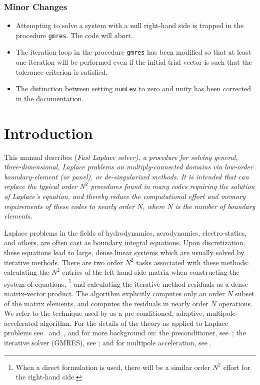 \subsubsection{Minor Changes}
\begin{itemize}
\item{Attempting to solve a system with a null right-hand side is trapped in 
the procedure {\tt gmres}.  The code will abort.}

\item{The iteration loop in the procedure {\tt gmres} has been modified so
that at least one iteration will be performed even if the initial trial 
vector is such that the tolerance criterion is satisfied.}

\item{The distinction between setting {\tt numLev} to zero and unity has been
corrected in the documentation.}
\end{itemize}

\newpage
\section{Introduction}
\label{s:intro}
This manual describes \fas (\it Fast Lap\rm lace solver), a procedure 
for solving general, three-dimensional, Laplace problems on 
multiply-connected domains via low-order boundary-element (or panel), 
or de-singularized methods.  It is intended that \fas can replace the typical 
order $N^2$ procedures found in many codes requiring the solution of 
Laplace's equation, and thereby reduce the computational effort 
and memory requirements of these codes to nearly order $N$, where $N$ is 
the number of boundary elements.  

Laplace problems in the fields of hydrodynamics, aerodynamics, electro-statics, 
and others,
are often cast as boundary integral equations.  Upon discretization, these
equations lead to large, dense linear systems which are usually solved 
by iterative methods.  There are two order $N^2$ tasks associated with these
methods:  calculating the $N^2$ entries  of the left-hand side matrix 
when constructing  the system of equations,
\footnote {
When a direct formulation is used,
there will be a similar order $N^2$ effort for the right-hand side.
} 
and calculating the iterative method residuals as a dense matrix-vector 
product.
The \fas algorithm explicitly computes only an order $N$
subset of the matrix elements, and computes the residuals in 
nearly order $N$ operations.  We refer to the technique used by \fas as a 
pre-conditioned, adaptive, multipole-accelerated algorithm.  For the
details of the theory as applied to Laplace problems see~\cite{nabors94}
and~\cite{korsmeyer93},
and for more background on: the preconditioner, see~\cite{vavasi92};
the iterative solver (GMRES), see \cite{saad86}; and for multipole 
acceleration, see \cite{greeng87} \cite{greeng88}.

